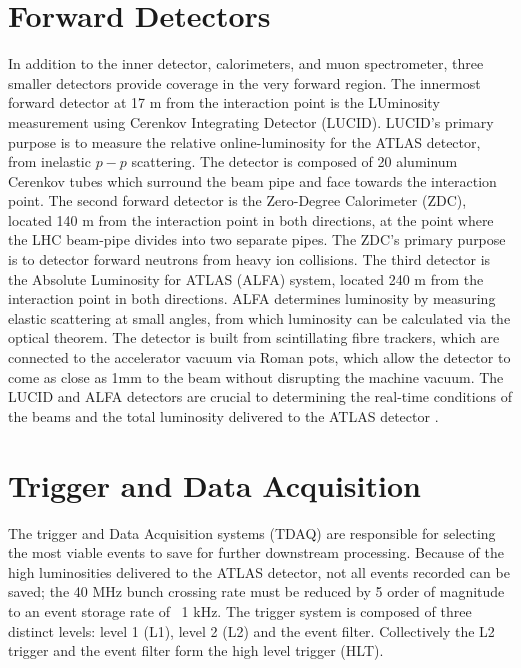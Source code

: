 \section{Forward Detectors}
	In addition to the inner detector, calorimeters, and muon spectrometer, three smaller detectors provide coverage in the very forward region. The innermost forward detector at 17 m from the interaction point is the LUminosity measurement using Cerenkov Integrating Detector (LUCID). LUCID's primary purpose is to measure the relative online-luminosity for the ATLAS detector, from inelastic $p-p$ scattering. The detector is composed of 20 aluminum Cerenkov tubes which surround the beam pipe and face towards the interaction point. The second forward detector is the Zero-Degree Calorimeter (ZDC), located 140 m from the interaction point in both directions, at the point where the LHC beam-pipe divides into two separate pipes. The ZDC's primary purpose is to detector forward neutrons from heavy ion collisions. The third detector is the Absolute Luminosity for ATLAS (ALFA) system, located 240 m from the interaction point in both directions. ALFA determines luminosity by measuring elastic scattering at small angles, from which luminosity can be calculated via the optical theorem. The detector is built from scintillating fibre trackers, which are connected to the accelerator vacuum via Roman pots, which allow the detector to come as close as 1mm to the beam without disrupting the machine vacuum. The LUCID and ALFA detectors are crucial to determining the real-time conditions of the beams and the total luminosity delivered to the ATLAS detector  \cite{atlas_overview}.

\section{Trigger and Data Acquisition}
	The trigger and Data Acquisition systems (TDAQ) are responsible for selecting the most viable events to save for further downstream processing. Because of the high luminosities delivered to the ATLAS detector, not all events recorded can be saved; the 40 MHz bunch crossing rate must be reduced by 5 order of magnitude to an event storage rate of ~1 kHz. The trigger system is composed of three distinct levels: level 1 (L1), level 2 (L2) and the event filter. Collectively the L2 trigger and the event filter form the high level trigger (HLT).\\

